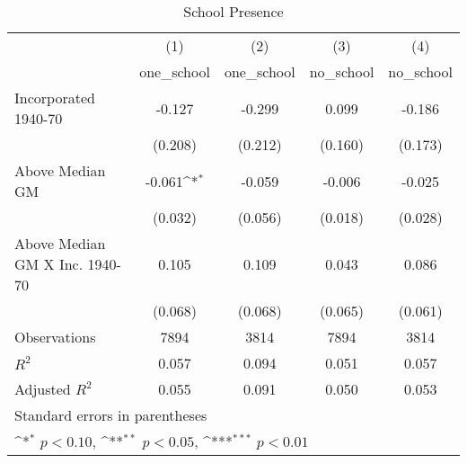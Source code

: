 \begin{table}[htbp]\centering
\def\sym#1{\ifmmode^{#1}\else\(^{#1}\)\fi}
\caption{School Presence}
\begin{tabular}{l*{4}{c}}
\hline\hline
                    &\multicolumn{1}{c}{(1)}&\multicolumn{1}{c}{(2)}&\multicolumn{1}{c}{(3)}&\multicolumn{1}{c}{(4)}\\
                    &\multicolumn{1}{c}{one\_school}&\multicolumn{1}{c}{one\_school}&\multicolumn{1}{c}{no\_school}&\multicolumn{1}{c}{no\_school}\\
\hline
Incorporated 1940-70&      -0.127         &      -0.299         &       0.099         &      -0.186         \\
                    &     (0.208)         &     (0.212)         &     (0.160)         &     (0.173)         \\
[1em]
Above Median GM     &      -0.061\sym{*}  &      -0.059         &      -0.006         &      -0.025         \\
                    &     (0.032)         &     (0.056)         &     (0.018)         &     (0.028)         \\
[1em]
Above Median GM X Inc. 1940-70&       0.105         &       0.109         &       0.043         &       0.086         \\
                    &     (0.068)         &     (0.068)         &     (0.065)         &     (0.061)         \\
\hline
Observations        &        7894         &        3814         &        7894         &        3814         \\
\(R^{2}\)           &       0.057         &       0.094         &       0.051         &       0.057         \\
Adjusted \(R^{2}\)  &       0.055         &       0.091         &       0.050         &       0.053         \\
\hline\hline
\multicolumn{5}{l}{\footnotesize Standard errors in parentheses}\\
\multicolumn{5}{l}{\footnotesize \sym{*} \(p<0.10\), \sym{**} \(p<0.05\), \sym{***} \(p<0.01\)}\\
\end{tabular}
\end{table}
